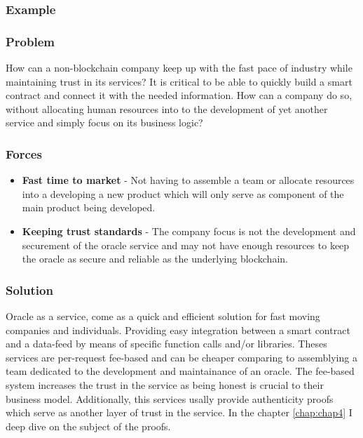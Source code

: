 \subsubsection{Example}



\subsubsection{Problem}
How can a non-blockchain company keep up with the fast pace of industry while maintaining trust in its services? It is critical to be able to quickly build a smart contract and connect it with the needed information. How can a company do so, without allocating human resources into to the development of yet another service and simply focus on its business logic?

\subsubsection{Forces}

\begin{itemize}
  \item \textbf{Fast time to market} - Not having to assemble a team or allocate resources into a developing a new product which will only serve as component of the main product being developed.
  \item \textbf{Keeping trust standards} - The company focus is not the development and securement of the oracle service and may not have enough resources to keep the oracle as secure and reliable as the underlying blockchain.
\end{itemize}


\subsubsection{Solution}
Oracle as a service, come as a quick and efficient solution for fast moving companies and individuals. Providing easy integration between a smart contract and a data-feed by means of specific function calls and/or libraries. Theses services are per-request fee-based and can be cheaper comparing to assemblying a team dedicated to the development and maintainance of an oracle. The fee-based system increases the trust in the service as being honest is crucial to their business model. Additionally, this services usally provide authenticity proofs which serve as another layer of trust in the service. In the chapter \ref{chap:chap4} I deep dive on the subject of the proofs.

